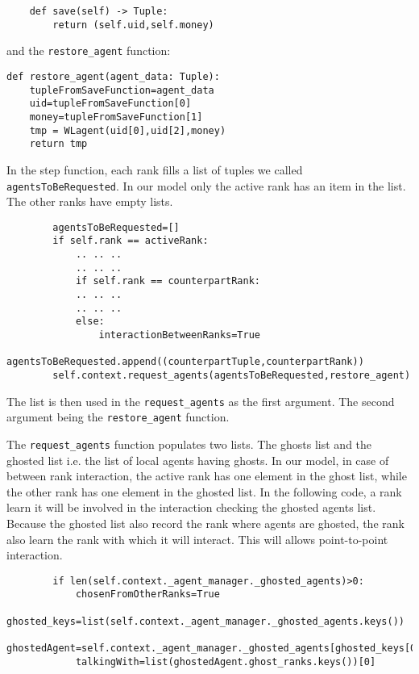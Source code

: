 \documentclass{article}
\begin{document}
\begin{verbatim}
    def save(self) -> Tuple:
        return (self.uid,self.money)
\end{verbatim}

and the \verb+restore_agent+ function:

\begin{verbatim}
def restore_agent(agent_data: Tuple):
    tupleFromSaveFunction=agent_data
    uid=tupleFromSaveFunction[0]
    money=tupleFromSaveFunction[1]
    tmp = WLagent(uid[0],uid[2],money)
    return tmp
\end{verbatim}


In the step function, each rank fills a list of tuples we called \verb+agentsToBeRequested+.
In our model only the active rank has an item in the list. The other ranks have empty lists.

\begin{verbatim}
        agentsToBeRequested=[]
        if self.rank == activeRank:
            .. .. ..
            .. .. ..
            if self.rank == counterpartRank:
            .. .. ..
            .. .. ..
            else:
                interactionBetweenRanks=True
                agentsToBeRequested.append((counterpartTuple,counterpartRank))
        self.context.request_agents(agentsToBeRequested,restore_agent)
\end{verbatim}
The list is then used in the \verb+request_agents+ as the first argument. The second argument being the \verb+restore_agent+ function.

The \verb+request_agents+ function populates two lists. The ghosts list and the ghosted list i.e. the list of local agents having ghosts. 
In our model, in case of between rank interaction, the active rank has one element in the ghost list, while the other rank has one element in the ghosted list.
In the following code, a rank learn it will be involved in the interaction checking the ghosted agents list. Because the ghosted list also record the rank where agents are ghosted, the rank also learn the rank with which it will interact. This will allows point-to-point interaction.

\begin{verbatim}
        if len(self.context._agent_manager._ghosted_agents)>0:
            chosenFromOtherRanks=True
            ghosted_keys=list(self.context._agent_manager._ghosted_agents.keys())
            ghostedAgent=self.context._agent_manager._ghosted_agents[ghosted_keys[0]]
            talkingWith=list(ghostedAgent.ghost_ranks.keys())[0]
\end{verbatim}
 
\end{document}
